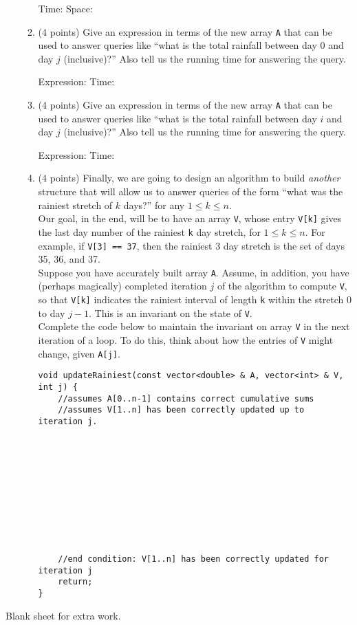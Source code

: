 \documentclass[11pt]{article}
\newcommand{\fillinblank}[1]{\fillinblankmath{\mbox{#1}}}
\newcommand{\fillinblankmath}[1]{\begingroup\setlength{\fboxsep}{1em}\setlength{\fboxrule}{2pt}\fbox{\LARGE\phantom{#1}}\endgroup}
\begin{document}
\begin{enumerate}
\begin{enumerate}
Time: \fillinblank{MMMM} Space: \fillinblank{MMMM}

\item (4 points) Give an expression in terms of the new array {\tt A} that can be used to answer queries like ``what is the total rainfall between day $0$ and day $j$ (inclusive)?'' Also tell us the running time for answering the query.

Expression: \fillinblank{MMMMMMMM} Time: \fillinblank{MMMM}

\item (4 points) Give an expression in terms of the new array {\tt A} that can be used to answer queries like ``what is the total rainfall between day $i$ and day $j$ (inclusive)?'' Also tell us the running time for answering the query.

Expression: \fillinblank{MMMMMMMM} Time: \fillinblank{MMMM}

\item (4 points) Finally, we are going to design an algorithm to build {\em another} structure that will allow us to answer queries of the form ``what was the rainiest stretch of $k$ days?'' for any $1\leq k\leq n$.\\

Our goal, in the end, will be to have an array {\tt V}, whose entry {\tt V[k]} gives the last day number of the rainiest {\tt k} day stretch, for $1\leq k\leq n$. For example, if {\tt V[3] == 37}, then the rainiest 3 day stretch is the set of days 35, 36, and 37. \\

Suppose you have accurately built array {\tt A}. Assume, in addition, you have (perhaps magically) completed iteration $j$ of the algorithm to compute {\tt V}, so that {\tt V[k]} indicates the rainiest interval of length {\tt k} within the stretch 0 to day $j-1$. This is an invariant on the state of {\tt V}.\\

Complete the code below to maintain the invariant on array {\tt V} in the next iteration of a loop. To do this, think about how the entries of {\tt V} might change, given {\tt A[j]}. 

\begin{lstlisting}
void updateRainiest(const vector<double> & A, vector<int> & V, int j) {
    //assumes A[0..n-1] contains correct cumulative sums
    //assumes V[1..n] has been correctly updated up to iteration j.
    
 
 
 
 
    
    
    
    
    
    
    //end condition: V[1..n] has been correctly updated for iteration j
    return;
}
\end{lstlisting}


\end{enumerate}

\end{enumerate}

\newpage
Blank sheet for extra work.
\end{document}
